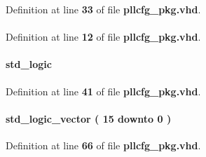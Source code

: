 Definition at line {\bf 33} of file {\bf pllcfg\+\_\+pkg.\+vhd}.

\paragraph[{ieee}]{\hspace{0.3cm}{\ttfamily [Library]}}\label{classpllcfg__pkg_a0a6af6eef40212dbaf130d57ce711256}


Definition at line {\bf 12} of file {\bf pllcfg\+\_\+pkg.\+vhd}.

\paragraph[{m\+\_\+byp}]{ {\bfseries \textcolor{comment}{std\+\_\+logic}\textcolor{vhdlchar}{ }} \hspace{0.3cm}{\ttfamily [Record]}}\label{classpllcfg__pkg_a6d234b7b186b1bb688cb5194af20d7b7}


Definition at line {\bf 41} of file {\bf pllcfg\+\_\+pkg.\+vhd}.

\paragraph[{m\+\_\+cnt}]{ {\bfseries \textcolor{comment}{std\+\_\+logic\+\_\+vector}\textcolor{vhdlchar}{ }\textcolor{vhdlchar}{(}\textcolor{vhdlchar}{ }\textcolor{vhdlchar}{ } \textcolor{vhdldigit}{15} \textcolor{vhdlchar}{ }\textcolor{keywordflow}{downto}\textcolor{vhdlchar}{ }\textcolor{vhdlchar}{ } \textcolor{vhdldigit}{0} \textcolor{vhdlchar}{ }\textcolor{vhdlchar}{)}\textcolor{vhdlchar}{ }} \hspace{0.3cm}{\ttfamily [Record]}}\label{classpllcfg__pkg_ae04aef686ba964b550b2de0a1a212f27}


Definition at line {\bf 66} of file {\bf pllcfg\+\_\+pkg.\+vhd}.

